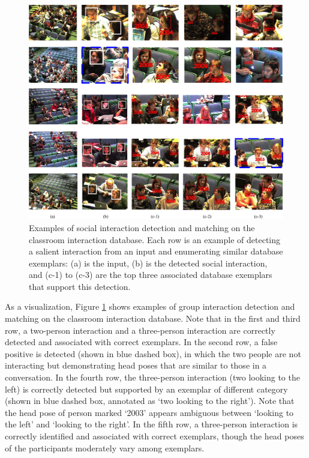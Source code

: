 \documentclass[10pt,twocolumn,letterpaper]{article}
\begin{document}
\begin{figure}
\begin{center}
\includegraphics[scale=2.25]{retrieved.png}
\end{center}
\vspace{-10pt}
\caption{Examples of social interaction detection and matching on the classroom interaction database. Each row is an example of detecting a salient interaction from an input and enumerating similar database exemplars: (a) is the input, (b) is the detected social interaction, and (c-1) to (c-3) are the top three associated database exemplars that support this detection.}
\label{retrieved}
\end{figure}


As a visualization, Figure \ref{retrieved} shows examples of group interaction detection and matching on the classroom interaction database. Note that in the first and third row, a two-person interaction and a three-person interaction are correctly detected and associated with correct exemplars. In the second row, a false positive is detected (shown in blue dashed box), in which the two people are not interacting but demonstrating head poses that are similar to those in a conversation. In the fourth row, the three-person interaction (two looking to the left) is correctly detected but supported by an exemplar of different category (shown in blue dashed box, annotated as `two looking to the right'). Note that the head pose of person marked `2003' appears ambiguous between `looking to the left' and `looking to the right'. In the fifth row, a three-person interaction is correctly identified and associated with correct exemplars, though the head poses of the participants moderately vary among exemplars. 
\end{document}

